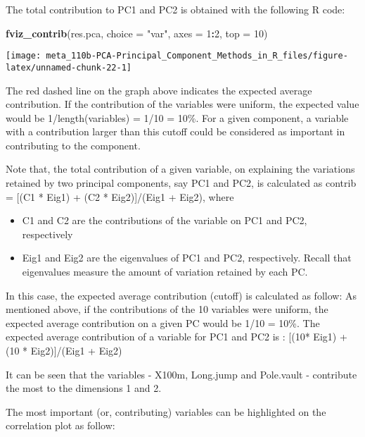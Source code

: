 \documentclass[]{book}
\newenvironment{Shaded}{\begin{snugshade}}{\end{snugshade}}
\newcommand{\DataTypeTok}[1]{\textcolor[rgb]{0.13,0.29,0.53}{#1}}
\newcommand{\DecValTok}[1]{\textcolor[rgb]{0.00,0.00,0.81}{#1}}
\newcommand{\KeywordTok}[1]{\textcolor[rgb]{0.13,0.29,0.53}{\textbf{#1}}}
\newcommand{\NormalTok}[1]{#1}
\newcommand{\OperatorTok}[1]{\textcolor[rgb]{0.81,0.36,0.00}{\textbf{#1}}}
\newcommand{\StringTok}[1]{\textcolor[rgb]{0.31,0.60,0.02}{#1}}
\providecommand{\tightlist}{%
  \setlength{\itemsep}{0pt}\setlength{\parskip}{0pt}}
\begin{document}
The total contribution to PC1 and PC2 is obtained with the following R code:

\begin{Shaded}
\begin{Highlighting}[]
\KeywordTok{fviz_contrib}\NormalTok{(res.pca, }\DataTypeTok{choice =} \StringTok{"var"}\NormalTok{, }\DataTypeTok{axes =} \DecValTok{1}\OperatorTok{:}\DecValTok{2}\NormalTok{, }\DataTypeTok{top =} \DecValTok{10}\NormalTok{)}
\end{Highlighting}
\end{Shaded}

\begin{center}\texttt{[image: meta\_110b-PCA-Principal\_Component\_Methods\_in\_R\_files/figure-latex/unnamed-chunk-22-1]} \end{center}

The red dashed line on the graph above indicates the expected average contribution. If the contribution of the variables were uniform, the expected value would be 1/length(variables) = 1/10 = 10\%. For a given component, a variable with a contribution larger than this cutoff could be considered as important in contributing to the component.

Note that, the total contribution of a given variable, on explaining the variations retained by two principal components, say PC1 and PC2, is calculated as contrib = {[}(C1 * Eig1) + (C2 * Eig2){]}/(Eig1 + Eig2), where

\begin{itemize}
\tightlist
\item
  C1 and C2 are the contributions of the variable on PC1 and PC2, respectively
\item
  Eig1 and Eig2 are the eigenvalues of PC1 and PC2, respectively. Recall that eigenvalues measure the amount of variation retained by each PC.
\end{itemize}

In this case, the expected average contribution (cutoff) is calculated as follow: As mentioned above, if the contributions of the 10 variables were uniform, the expected average contribution on a given PC would be 1/10 = 10\%. The expected average contribution of a variable for PC1 and PC2 is : {[}(10* Eig1) + (10 * Eig2){]}/(Eig1 + Eig2)

It can be seen that the variables - X100m, Long.jump and Pole.vault - contribute the most to the dimensions 1 and 2.

The most important (or, contributing) variables can be highlighted on the correlation plot as follow:
\end{document}
